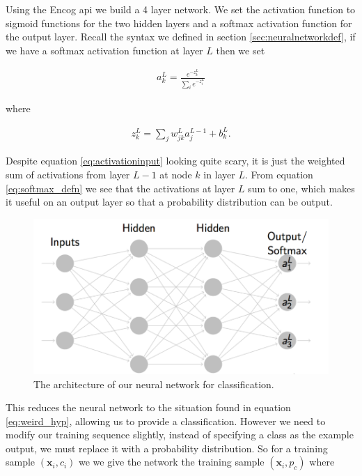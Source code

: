 \documentclass[12pt,twoside,notitlepage]{report}
\newcommand{\vc}[1]{\mathbf{#1}}
\begin{document}
        Using the Encog api we build a 4 layer network. We set the activation function to sigmoid functions for the 
        two hidden layers and a softmax activation function for the output layer. Recall the syntax we defined in section 
        \ref{sec:neuralnetworkdef}, if we have a softmax activation function at layer $L$ then we set 

        \begin{align}
            a_k^L = \frac{e^{-z_k^L}}{\sum_i e^{-z_i^L}}
            \label{eq:softmax_defn}
        \end{align}

        where

        \begin{align}
            z_k^L = \sum\limits_j w_{jk}^L a_j^{L-1} + b_k^L.
            \label{eq:activationinput}
        \end{align}

        Despite equation \ref{eq:activationinput} looking quite scary, it is just the weighted sum of activations from 
        layer $L-1$ at node $k$ in layer $L$. From equation \ref{eq:softmax_defn} we see that the activations at layer 
        $L$ sum to one, which makes it useful on an output layer so that a probability distribution can be output. 

        \begin{figure}
            \centering
            \includegraphics{softmax_neuralnetworks}
            \caption{The architecture of our neural network for classification.}
        \end{figure}

        This reduces the neural network to the situation found in equation \ref{eq:weird_hyp}, allowing us to provide 
        a classification. However we need to modify our training sequence slightly, instead of specifying a class as the 
        example output, we must replace it with a probability distribution. So for a training sample $(\vc{x}_i, c_i)$ we
        we give the network the training sample $(\vc{x}_i, p_c)$ where 
\end{document}
